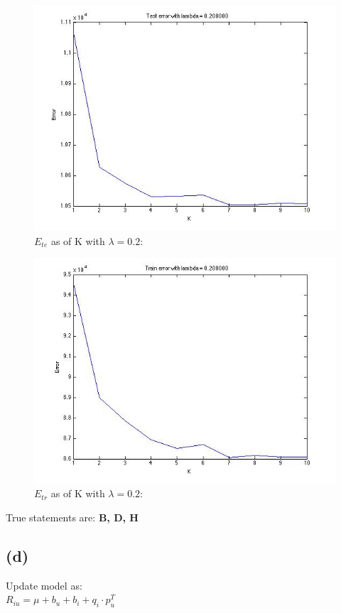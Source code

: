 \documentclass{article}
\begin{document}
\begin{figure}[H]
\centering
\includegraphics[scale=0.5]{TestErrorLambda02.jpg}
\caption{ $E_{te}$ as of K with $\lambda=0.2$:}
\label{}
\end{figure}

\begin{figure}[H]
\centering
\includegraphics[scale=0.5]{TrainErrorLambda02.jpg}
\caption{ $E_{tr}$ as of K with $\lambda=0.2$:}
\label{}
\end{figure}

True statements are: \textbf{B, D, H}


\subsection{(d)}
Update model as:\\
$R_{iu} = \mu + b_u + b_i + q_i\cdot p_u^T$ \\
\end{document}
